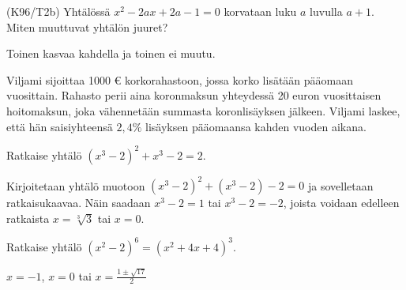 \begin{tehtavasivu}
\begin{tehtava}
(K96/T2b) Yhtälössä $x^2-2ax+2a-1=0$ korvataan luku $a$ luvulla $a+1$. Miten muuttuvat yhtälön juuret?
\begin{vastaus}
     Toinen kasvaa kahdella ja toinen ei muutu.
    \end{vastaus}
\end{tehtava}

\begin{tehtava}
	Viljami sijoittaa 1000 € korkorahastoon, jossa korko lisätään pääomaan vuosittain. Rahasto perii aina koronmaksun yhteydessä
	20 euron vuosittaisen hoitomaksun, joka vähennetään summasta koronlisäyksen jälkeen. Viljami laskee, että hän saisiyhteensä $2,4\%$ lisäyksen
	pääomaansa kahden vuoden aikana.
        \begin{alakohdat}
        \end{alakohdat}
	\begin{vastaus}
	    \begin{alakohdat}
	    \end{alakohdat}
	\end{vastaus}
\end{tehtava}

\begin{tehtava}
	Ratkaise yhtälö $(x^3-2)^2+x^3-2=2$.
	\begin{vastaus}
		Kirjoitetaan yhtälö muotoon $(x^3-2)^2+(x^3-2)-2=0$ ja sovelletaan ratkaisukaavaa.
		Näin saadaan $x^3-2=1$ tai $x^3-2=-2$, joista voidaan edelleen ratkaista $x=\sqrt[3]{3}$ tai $x=0$.
	\end{vastaus}
\end{tehtava}

\begin{tehtava} %
	Ratkaise yhtälö $(x^2-2)^6=(x^2+4x+4)^3$.
	\begin{vastaus}
		$x=-1$, $x=0$ tai $x=\frac{1 \pm \sqrt{17}}{2}$
	\end{vastaus}
\end{tehtava}

\end{tehtavasivu}
